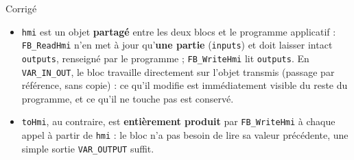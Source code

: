 \begin{UPSTIactivite}
\begin{UPSTIcorrectionP}{Corrigé}
\begin{itemize}
    \item \texttt{hmi} est un objet \textbf{partagé} entre les deux blocs et
    le programme applicatif : \texttt{FB\_ReadHmi} n'en met à jour
    qu'\textbf{une partie} (\texttt{inputs}) et doit laisser intact
    \texttt{outputs}, renseigné par le programme ;
    \texttt{FB\_WriteHmi} lit \texttt{outputs}. En \texttt{VAR\_IN\_OUT},
    le bloc travaille directement sur l'objet transmis (passage par
    référence, sans copie) : ce qu'il modifie est immédiatement visible du
    reste du programme, et ce qu'il ne touche pas est conservé.
    \item \texttt{toHmi}, au contraire, est \textbf{entièrement produit} par
    \texttt{FB\_WriteHmi} à chaque appel à partir de \texttt{hmi} : le bloc
    n'a pas besoin de lire sa valeur précédente, une simple sortie
    \texttt{VAR\_OUTPUT} suffit.
\end{itemize}
\end{UPSTIcorrectionP}
\end{UPSTIactivite}

